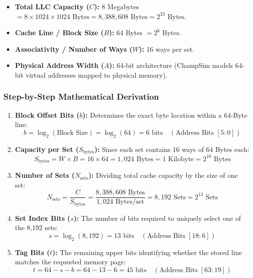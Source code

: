\documentclass[11pt, a4paper]{article}
\begin{document}
\begin{defensebox}[title=\textbf{Address Decomposition Parameters}]
\begin{itemize}[leftmargin=1.2em]
  \item \textbf{Total LLC Capacity ($C$):} 8 Megabytes $= 8 \times 1024 \times 1024 \text{ Bytes} = 8,388,608 \text{ Bytes} = 2^{23} \text{ Bytes}$.
  \item \textbf{Cache Line / Block Size ($B$):} 64 Bytes $= 2^6 \text{ Bytes}$.
  \item \textbf{Associativity / Number of Ways ($W$):} 16 ways per set.
  \item \textbf{Physical Address Width ($A$):} 64-bit architecture (ChampSim models 64-bit virtual addresses mapped to physical memory).
\end{itemize}
\end{defensebox}

\subsubsection{Step-by-Step Mathematical Derivation}
\begin{enumerate}[leftmargin=1.5em]
  \item \textbf{Block Offset Bits ($b$):}
  Determines the exact byte location within a 64-Byte line:
  \begin{equation}
    b = \log_2(\text{Block Size}) = \log_2(64) = 6 \text{ bits} \quad (\text{Address Bits } [5:0])
  \end{equation}

  \item \textbf{Capacity per Set ($S_{\text{bytes}}$):}
  Since each set contains 16 ways of 64 Bytes each:
  \begin{equation}
    S_{\text{bytes}} = W \times B = 16 \times 64 = 1,024 \text{ Bytes} = 1 \text{ Kilobyte} = 2^{10} \text{ Bytes}
  \end{equation}

  \item \textbf{Number of Sets ($N_{\text{sets}}$):}
  Dividing total cache capacity by the size of one set:
  \begin{equation}
    N_{\text{sets}} = \frac{C}{S_{\text{bytes}}} = \frac{8,388,608 \text{ Bytes}}{1,024 \text{ Bytes/set}} = 8,192 \text{ Sets} = 2^{13} \text{ Sets}
  \end{equation}

  \item \textbf{Set Index Bits ($s$):}
  The number of bits required to uniquely select one of the 8,192 sets:
  \begin{equation}
    s = \log_2(8,192) = 13 \text{ bits} \quad (\text{Address Bits } [18:6])
  \end{equation}

  \item \textbf{Tag Bits ($t$):}
  The remaining upper bits identifying whether the stored line matches the requested memory page:
  \begin{equation}
    t = 64 - s - b = 64 - 13 - 6 = 45 \text{ bits} \quad (\text{Address Bits } [63:19])
  \end{equation}
\end{enumerate}
\end{document}
